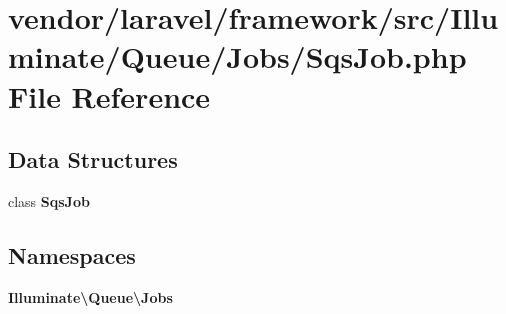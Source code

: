 \section{vendor/laravel/framework/src/\+Illuminate/\+Queue/\+Jobs/\+Sqs\+Job.php File Reference}
\label{_sqs_job_8php}
\subsection*{Data Structures}
\begin{DoxyCompactItemize}
\item 
class {\bf Sqs\+Job}
\end{DoxyCompactItemize}
\subsection*{Namespaces}
\begin{DoxyCompactItemize}
\item 
 {\bf Illuminate\textbackslash{}\+Queue\textbackslash{}\+Jobs}
\end{DoxyCompactItemize}
